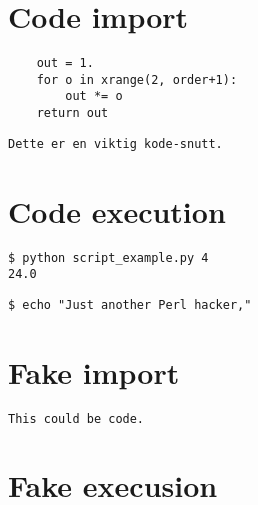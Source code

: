 \documentclass{article}
\renewenvironment{shadedwbar}{
\def\FrameCommand{\color[rgb]{0.7,     0.95686, 1}\vrule width 1mm\normalcolor\colorbox{shadecolor}}\FrameRule0.6pt
\MakeFramed {\advance\hsize-2mm\FrameRestore}\vskip3mm}{\vskip0mm\endMakeFramed}
\renewenvironment{shadedquoteBlueBar}[1][]{
\bgroup\rmfamily
\fboxsep=0mm\relax
\begin{shadedwbar}
\list{}{\parsep=-2mm\parskip=0mm\topsep=0pt\leftmargin=2mm
\rightmargin=2\leftmargin\leftmargin=4pt\relax}
\item\relax}
{\endlist\end{shadedwbar}\egroup}
\begin{document}
\section*{Code import}

\begin{shadedquoteBlueBar}
\fontsize{9pt}{9pt}
\begin{Verbatim}
    out = 1.
    for o in xrange(2, order+1):
        out *= o
    return out
\end{Verbatim}
\end{shadedquoteBlueBar}
\noindent

\begin{shadedquoteBlueBar}
\fontsize{9pt}{9pt}
\begin{Verbatim}
Dette er en viktig kode-snutt.
\end{Verbatim}
\end{shadedquoteBlueBar}
\noindent

\section*{Code execution}


\begin{Verbatim}[numbers=none,frame=lines,label=\fbox{{\tiny Terminal}},fontsize=\fontsize{9pt}{9pt},
labelposition=topline,framesep=2.5mm,framerule=0.7pt]
$ python script_example.py 4
24.0

\end{Verbatim}
\noindent

\begin{Verbatim}[numbers=none,frame=lines,label=\fbox{{\tiny Terminal}},fontsize=\fontsize{9pt}{9pt},
labelposition=topline,framesep=2.5mm,framerule=0.7pt]
$ echo "Just another Perl hacker,"
\end{Verbatim}
\noindent

\section*{Fake import}

\begin{Verbatim}
This could be code.
\end{Verbatim}

\section*{Fake execusion}
\end{document}

